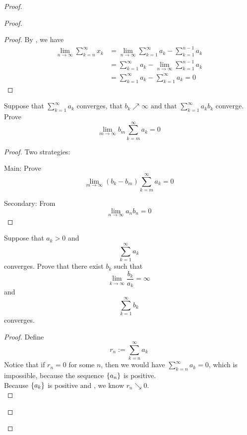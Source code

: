 \documentclass{report}
\begin{document}
\begin{proof}
\begin{proof}
\begin{proof} 
By , we have
\begin{align}
  \lim_{n\to\infty}\sum_{k=n}^\infty x_k&=\lim_{n\to\infty}\sum_{k=1}^\infty a_k-\sum_{k=1}^{n-1}a_k\\
  &=\sum_{k=1}^\infty a_k-\lim_{n\to\infty}\sum_{k=1}^{n-1}a_k\\
  &=\sum_{k=1}^\infty a_k-\sum_{k=1}^\infty a_k=0
\end{align}
\end{proof}
\begin{question}{}{}
Suppose that $\sum_{k=1}^{\infty} a_k $ converges, that $b_k \nearrow \infty \text{ and that }\sum_{k=1}^{\infty} a_k b_k $
converge. Prove
\begin{equation}
\lim_{m\to\infty}b_m\sum_{k=m}^\infty a_k=0
\end{equation}
\end{question}
\begin{proof}
Two strategies: 

Main: Prove
\begin{equation}
\lim_{m\to\infty}(b_k-b_m)\sum_{k=m}^\infty a_k=0
\end{equation}

Secondary: From
\begin{equation}
\lim_{n\to\infty}a_nb_n=0
\end{equation}

\end{proof}
\begin{question}{}{}
Suppose that \( a_k > 0 \) and 
\[
\sum_{k=1}^{\infty} a_k
\]
converges. Prove that there exist \( b_k \) such that 
\[
\lim_{k \to \infty} \frac{b_k}{a_k} = \infty
\]
and 
\[
\sum_{k=1}^{\infty} b_k
\]
converges.
\end{question}
\begin{proof}
Define
\begin{equation}
r_n:=\sum_{k=n}^\infty a_k
\end{equation}
Notice that if $r_n=0$ for some $n$, then we would have $\sum_{k=n}^\infty a_k=0$, which is impossible, because the sequence $\{ a_n \}$ is positive.\\

Because $\{ a_k \}$ is positive and , we know $r_n\searrow 0$.\\


\end{proof}
\end{proof}
\end{proof}
\end{document}
